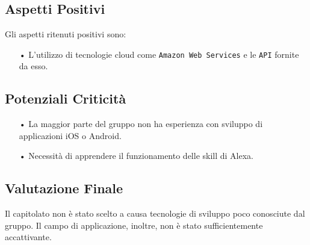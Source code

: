 \subsection{Aspetti Positivi}
Gli aspetti ritenuti positivi sono:
\begin{itemize}
\item[•] L'utilizzo di tecnologie cloud come \texttt{Amazon Web Services} e le \texttt{API} fornite da esso.
\end{itemize}

\subsection{Potenziali Criticità}
\begin{itemize}
\item[•] La maggior parte del gruppo non ha esperienza con sviluppo di applicazioni iOS o Android.
\item[•] Necessità di apprendere il funzionamento delle skill di Alexa.
\end{itemize}

\subsection{Valutazione Finale}
Il capitolato non è stato scelto a causa tecnologie di sviluppo poco conosciute dal gruppo. Il campo di applicazione, inoltre, non è stato sufficientemente accattivante.
